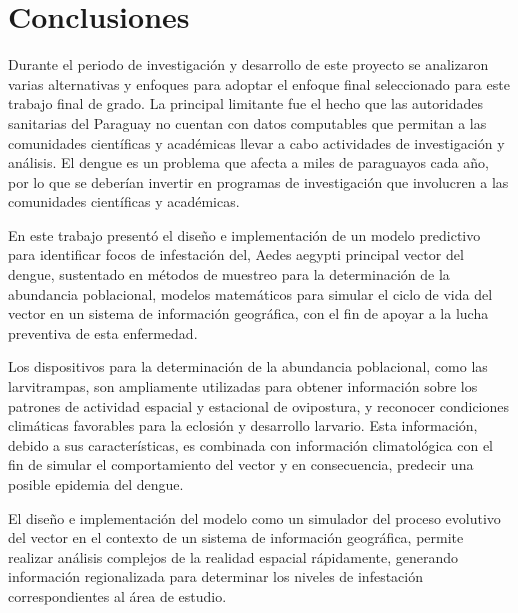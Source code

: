 \chapter{Conclusiones}
Durante el periodo de investigación y desarrollo de este proyecto se analizaron varias
alternativas y enfoques para adoptar el enfoque final seleccionado para este trabajo final de grado. La principal limitante fue el hecho que las autoridades sanitarias del Paraguay no cuentan con
datos computables que permitan a las comunidades científicas y académicas llevar a cabo actividades de investigación y análisis. El dengue es un problema que afecta a miles de paraguayos cada año, por lo que se deberían invertir en programas de investigación que involucren a las comunidades científicas y académicas.

En este trabajo presentó el diseño e implementación de un modelo predictivo para identificar focos
de infestación del, Aedes aegypti principal vector del dengue, sustentado en métodos de muestreo
para la determinación de la abundancia poblacional, modelos matemáticos para simular el ciclo de
vida del vector en un sistema de información geográfica, con el fin de apoyar a la lucha
preventiva de esta enfermedad.

Los dispositivos para la determinación de la abundancia poblacional, como las larvitrampas, son
ampliamente utilizadas para obtener información sobre los patrones de actividad espacial y
estacional de ovipostura, y reconocer condiciones climáticas favorables para la eclosión y
desarrollo larvario. Esta información, debido a sus características, es combinada con información
climatológica con el fin de simular el comportamiento del vector y en consecuencia, predecir una
posible epidemia del dengue.

El diseño e implementación del modelo como un simulador del proceso evolutivo del vector en el
contexto de un sistema de información geográfica, permite realizar análisis complejos de la
realidad espacial rápidamente, generando información regionalizada para determinar los niveles de
infestación correspondientes al área de estudio.

